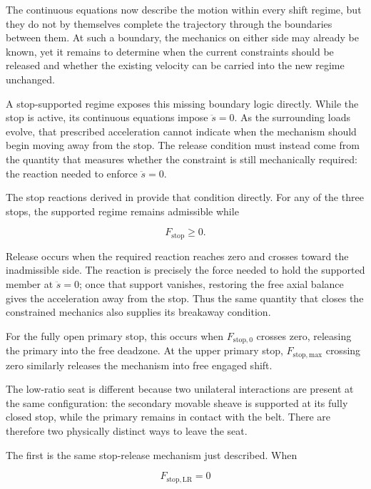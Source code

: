 \documentclass[11pt]{report}
\numberwithin{equation}{section}
\begin{document}
The continuous equations now describe the motion within every shift regime, but they do
not by themselves complete the trajectory through the boundaries between them. At such a
boundary, the mechanics on either side may already be known, yet it remains to determine
when the current constraints should be released and whether the existing velocity can be
carried into the new regime unchanged.

A stop-supported regime exposes this missing boundary logic directly. While the stop is
active, its continuous equations impose \(\ddot s=0\). As the surrounding loads evolve,
that prescribed acceleration cannot indicate when the mechanism should begin moving away
from the stop. The release condition must instead come from the quantity that measures
whether the constraint is still mechanically required: the reaction needed to enforce
\(\ddot s=0\).

The stop reactions derived in  provide
that condition directly. For any of the three stops, the supported regime remains
admissible while

\begin{equation}
    F_{\mathrm{stop}}\geq0.
    \label{eq:shift_stop_admissibility_recall}
\end{equation}

Release occurs when the required reaction reaches zero and crosses toward the
inadmissible side. The reaction is precisely the force needed to hold the supported
member at \(\ddot s=0\); once that support vanishes, restoring the free axial balance
gives the acceleration away from the stop. Thus the same quantity that closes the
constrained mechanics also supplies its breakaway condition.

For the fully open primary stop, this occurs when \(F_{\mathrm{stop},0}\) crosses zero,
releasing the primary into the free deadzone. At the upper primary stop,
\(F_{\mathrm{stop,max}}\) crossing zero similarly releases the mechanism into free
engaged shift.

The low-ratio seat is different because two unilateral interactions are present at the
same configuration: the secondary movable sheave is supported at its fully closed stop,
while the primary remains in contact with the belt. There are therefore two physically
distinct ways to leave the seat.

The first is the same stop-release mechanism just described. When

\begin{equation}
    F_{\mathrm{stop,LR}}=0
    \label{eq:low_ratio_stop_release_surface}
\end{equation}
\end{document}
